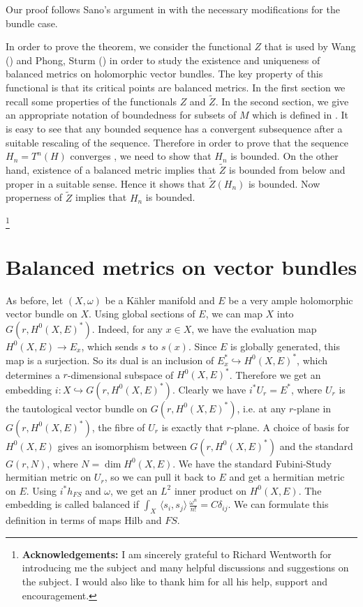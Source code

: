 \documentclass[12pt,oneside,notitlepage]{amsart}
\theoremstyle{definition}
\theoremstyle{remark}
\numberwithin{equation}{section}
\begin{document}
Our proof  follows Sano's argument in \cite{S} with the
necessary modifications for the bundle case.

In order to prove the theorem, we consider the functional $Z$ that
is used by Wang (\cite{W}) and Phong, Sturm (\cite{PS}) in order
to study the existence and uniqueness of balanced metrics on
holomorphic vector bundles. The key property of this functional is
that its critical points are balanced metrics. In the first
section we recall some properties of the functionals $Z$ and
$\widetilde{Z}$. In the second section, we give an appropriate
notation of boundedness for subsets of $M$ which is defined in
\cite{S}. It is easy to see that any bounded sequence has a
convergent subsequence after a suitable rescaling of the sequence.
Therefore in order to prove that the sequence $H_{n}=T^n(H)$
converges , we need to show that $H_{n}$ is bounded. On the other
hand, existence of a balanced metric implies that $\widetilde{Z}$
is bounded from below and proper in a suitable sense. Hence it
shows that $\widetilde{Z}(H_{n})$ is bounded. Now properness of
$\widetilde{Z}$ implies that $H_{n}$ is bounded.

\thanks{\textbf{Acknowledgements:} I am sincerely grateful to Richard Wentworth for introducing me the subject and many helpful discussions and suggestions
on the subject. I would also like to thank him for all his help,
support and encouragement.}

\section{Balanced metrics on vector bundles}

As before, let $(X,\omega)$ be a K\"ahler manifold and $E$ be a
very ample holomorphic vector bundle on $X$. Using global sections
of $E$, we can map $X$ into $G(r, H^{0}(X,E)^*)$. Indeed, for any
$x \in X$, we have the evaluation map $H^{0}(X,E)\rightarrow
E_{x}$, which sends $s$ to $s(x)$. Since $E$ is globally
generated, this map is a surjection. So its dual is an inclusion
of $E_{x}^* \hookrightarrow H^{0}(X,E)^*$, which determines a
$r$-dimensional subspace of $H^{0}(X,E)^*$. Therefore we get an
embedding $i: X\hookrightarrow G(r, H^{0}(X,E)^*)$. Clearly we
have $i^*U_{r}=E^*$, where $U_{r}$ is the tautological vector
bundle on $G(r, H^{0}(X,E)^*)$, i.e. at any $r$-plane in $G(r,
H^{0}(X,E)^*)$, the fibre of $U_{r}$ is exactly that $r$-plane. A
choice of basis for $H^{0}(X,E)$ gives an isomorphism between
$G(r, H^{0}(X,E)^*)$ and the standard $G(r,N)$, where $N= \dim
H^{0}(X,E)$. We have the standard Fubini-Study hermitian metric on
$U_{r}$, so we can pull it back to $E$ and get a hermitian metric
on $E$.  Using $i^*h_{FS}$ and $\omega$, we get an $L^{2}$ inner
product on $H^{0}(X,E)$. The embedding is called balanced if
$\int_{X} \, \langle s_{i}, s_{j}\rangle \,
\frac{\omega^{n}}{n!}=C \delta_{ij} $. We can formulate this
definition in terms of maps $\textrm{Hilb}$ and $FS$.
\end{document}
